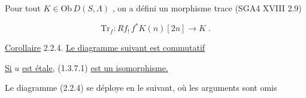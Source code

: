 Pour tout $K \in \mathrm{Ob}\, D(S, \Lambda)$ , on a défini un morphisme trace (SGA4 XVIII 2.9)

\begin{equation*}
\mathrm{Tr}_f : Rf_! \, f^* K(n) [2n] \longrightarrow K \; .
\end{equation*}

\underline{Corollaire} 2.2.4. \underline{Le diagramme suivant est commutatif}

\begin{center}
\end{center}
\underline{Si} $u$ \underline{est étale,} (1.3.7.1) \underline{est un isomorphisme.}

Le diagramme (2.2.4) se déploye en le suivant, où les arguments sont omis

